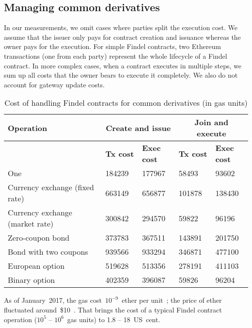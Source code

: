 \subsection{Managing common derivatives}

In our measurements, we omit cases where parties split the execution cost.
We assume that the issuer only pays for contract creation and issuance whereas the owner pays for the execution.
For simple Findel contracts, two Ethereum transactions (one from each party) represent the whole lifecycle of a Findel contract.
In more complex cases, when a contract executes in multiple steps, we sum up all costs that the owner bears to execute it completely.
We also do not account for gateway update costs.

\begin{table}
	\centering
	\begin{tabular}{|p{0.4\linewidth}|p{0.15\linewidth}|p{0.15\linewidth}|p{0.15\linewidth}|p{0.15\linewidth}|}
		\hline
		\textbf{Operation} & \multicolumn{2}{|c|}{\textbf{Create and issue}} & \multicolumn{2}{|c|}{\textbf{Join and execute}}\\
		\hline
		& \textbf{Tx cost} & \textbf{Exec cost} & \textbf{Tx cost} & \textbf{Exec cost} \\
		\hline
		One & 184239 & 177967 & 58493 & 93602 \\
		\hline
		Currency exchange (fixed rate) & 663149 & 656877 & 101878 & 138430 \\
		\hline
		Currency exchange (market rate) & 300842 & 294570 & 59822 & 96196 \\
		\hline
		Zero-coupon bond & 373783 & 367511 & 143891 & 201750 \\
		\hline
		Bond with two coupons & 939566 & 933294 & 346871 & 477100 \\
		\hline
		European option & 519628 & 513356 & 278191 & 411103 \\
		\hline
		Binary option & 402359 & 396087 & 59826 & 96204 \\
		\hline
	\end{tabular}
	\caption{Cost of handling Findel contracts for common derivatives (in gas units)}
	\label{tab:Ch10_Findel_Cost_2}
\end{table}

As of January~2017, the gas cost~$10^{-9}$~ether per unit~\cite{Ethstats}; the price of ether fluctuated around~\$10~\cite{Worldcoinindex}.
That brings the cost of a typical Findel contract operation ($10^5$ -- $10^6$~gas units) to 1.8 -- 18~US~cent.


